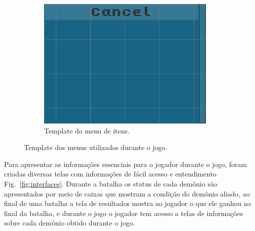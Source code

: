 \documentclass[
	12pt,				%
	openright,			%
	twoside,			%
	a4paper,			%
	english,			%
	french,				%
	spanish,			%
	brazil				%
	]{abntex2}
\begin{document}
\begin{figure}[h!]
\begin{subfigure}[b]{0.35\linewidth}
    \includegraphics[width=\linewidth]{bagtemplate.jpg}
    \caption{Template do menu de itens.}
  \end{subfigure}
  \caption{Template dos menus utilizados durante o jogo.}
  \label{fig:menus}
\end{figure}

Para apresentar as informações essenciais para o jogador durante o jogo, foram criadas diversas telas com informações de fácil acesso e entendimento Fig.~\ref{fig:interfaces}. Durante a batalha os status de cada demônio são apresentados por meio de caixas que mostram a condição do demônio aliado, ao final de uma batalha a tela de resultados mostra ao jogador o que ele ganhou ao final da batalha, e durante o jogo o jogador tem acesso a telas de informações sobre cada demônio obtido durante o jogo.
\end{document}
